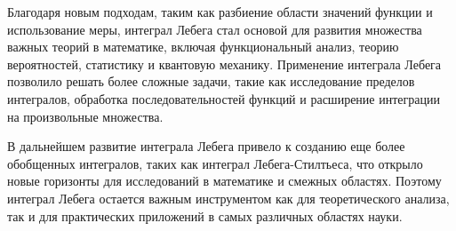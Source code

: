 \documentclass[a4paper,14pt]{extarticle}
\begin{document}
Благодаря новым подходам, таким как разбиение области значений функции и использование меры, интеграл Лебега стал основой для развития множества важных теорий в математике, включая функциональный анализ, теорию вероятностей, статистику и квантовую механику. Применение интеграла Лебега позволило решать более сложные задачи, такие как исследование пределов интегралов, обработка последовательностей функций и расширение интеграции на произвольные множества.

В дальнейшем развитие интеграла Лебега привело к созданию еще более обобщенных интегралов, таких как интеграл Лебега-Стилтьеса, что открыло новые горизонты для исследований в математике и смежных областях. Поэтому интеграл Лебега остается важным инструментом как для теоретического анализа, так и для практических приложений в самых различных областях науки.

\newpage
{}
\printbibliography
\end{document}
